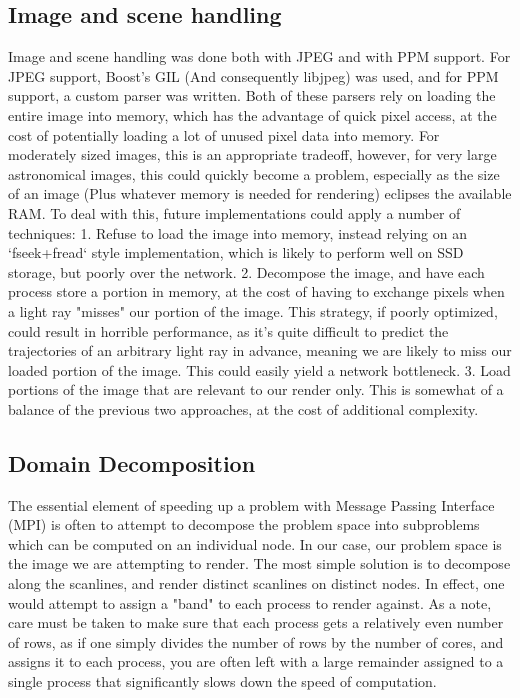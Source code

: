 \subsection {Image and scene handling}
Image and scene handling was done both with JPEG and with PPM support. For JPEG support, Boost's GIL  (And consequently libjpeg) was used, and for PPM support, a custom parser was written. Both of these parsers rely on loading the entire image into memory, which has the advantage of quick pixel access, at the cost of potentially loading a lot of unused pixel data into memory. For moderately sized images, this is an appropriate tradeoff, however, for very large astronomical images, this could quickly become a problem, especially as the size of an image (Plus whatever memory is needed for rendering) eclipses the available RAM. To deal with this, future implementations could apply a number of techniques:
1. Refuse to load the image into memory, instead relying on an `fseek+fread` style implementation, which is likely to perform well on SSD storage, but poorly over the network.
2. Decompose the image, and have each process store a portion in memory, at the cost of having to exchange pixels when a light ray "misses" our portion of the image. This strategy, if poorly optimized, could result in horrible performance, as it's quite difficult to predict the trajectories of an arbitrary light ray in advance, meaning we are likely to miss our loaded portion of the image. This could easily yield a network bottleneck.
3. Load portions of the image that are relevant to our render only. This is somewhat of a balance of the previous two approaches, at the cost of additional complexity. 


\subsection {Domain Decomposition}
The essential element of speeding up a problem with Message Passing Interface (MPI) \cite{mpi41} is often to attempt to decompose the problem space into subproblems which can be computed on an individual node. In our case, our problem space is the image we are attempting to render. The most simple solution is to decompose along the scanlines, and render distinct scanlines on distinct nodes. In effect, one would attempt to assign a "band" to each process to render against. As a note, care must be taken to make sure that each process gets a relatively even number of rows, as if one simply divides the number of rows by the number of cores, and assigns it to each process, you are often left with a large remainder assigned to a single process that significantly slows down the speed of computation.

